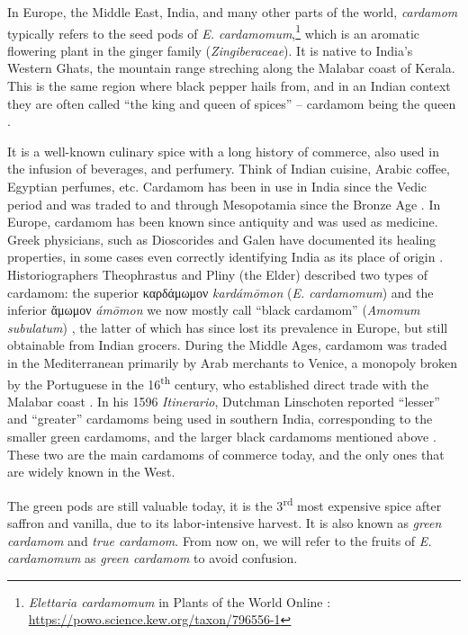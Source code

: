 \documentclass[12pt]{article}
\begin{document}

In Europe, the Middle East, India, and many other parts of the world, \textit{cardamom} typically refers to the seed pods of \textit{E. cardamomum},\footnote{\textit{Elettaria cardamomum} in Plants of the World Online \parencite{powo}: \url{https://powo.science.kew.org/taxon/796556-1}} which is an aromatic flowering plant in the ginger family (\textit{Zingiberaceae}). It is native to India's Western Ghats, the mountain range streching along the Malabar coast of Kerala. This is the same region where black pepper hails from, and in an Indian context they are often called ``the king and queen of spices'' -- cardamom being the queen \parencite{nair_2011_agronomy}. 

It is a well-known culinary spice with a long history of commerce, also used in the infusion of beverages, and perfumery. Think of Indian cuisine, Arabic coffee, Egyptian perfumes, etc. Cardamom has been in use in India since the Vedic period and was traded to and through Mesopotamia since the Bronze Age \parencite{ravindran_2002_cardamom}. In Europe, cardamom has been known since antiquity and was used as medicine. Greek physicians, such as Dioscorides and Galen have documented its healing properties, in some cases even correctly identifying India as its place of origin \parencites{parry_1969_spices}{anderson_2023_history}. Historiographers Theophrastus and Pliny (the Elder) described two types of cardamom: the superior καρδάμωμον \textit{kardámōmon} (\textit{E. cardamomum}) and the inferior ἄμωμον \textit{ámōmon} we now mostly call ``black cardamom'' (\textit{Amomum subulatum}) \parencite{prance_2005_cultural}, the latter of which has since lost its prevalence in Europe, but still obtainable from Indian grocers. During the Middle Ages, cardamom was traded in the Mediterranean primarily by Arab merchants to Venice, a monopoly broken by the Portuguese in the 16\textsuperscript{th} century, who established direct trade with the Malabar coast \parencite{cumo_2013_encyclopedia}. In his 1596 \textit{Itinerario}, Dutchman Linschoten reported ``lesser'' and ``greater'' cardamoms being used in southern India, corresponding to the smaller green cardamoms, and the larger black cardamoms mentioned above \parencite{nair_2020_geography}. These two are the main cardamoms of commerce today, and the only ones that are widely known in the West.

The green pods are still valuable today, it is the 3\textsuperscript{rd} most expensive spice after saffron and vanilla, due to its labor-intensive harvest. It is also known as \textit{green cardamom} and \textit{true cardamom}. From now on, we will refer to the fruits of \textit{E. cardamomum} as \textit{green cardamom} to avoid confusion.
\end{document}
